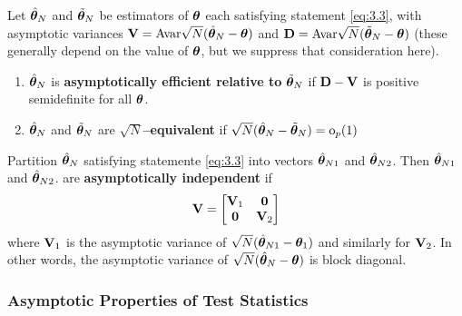 \documentclass[11pt, oneside, a4paper, article]{article}
\numberwithin{equation}{section}
\begin{document}
\begin{defn} 
Let $\hat{\boldsymbol{\theta}}_{N}$ and $\tilde{\boldsymbol{\theta}}_{N}$ be estimators of $\boldsymbol{\theta}$ each satisfying statement \eqref{eq:3.3}, with asymptotic variances
$\mathbf{V} = \text{Avar} \sqrt{N} (\hat{\boldsymbol{\theta}}_{N} - \boldsymbol{\theta})$
and
$\mathbf{D} = \text{Avar} \sqrt{N} (\tilde{\boldsymbol{\theta}}_{N} - \boldsymbol{\theta})$
(these generally depend on the value of $\boldsymbol{\theta}$, but we suppress that consideration here).

\vspace{-1 ex}
\begin{enumerate}
	\item 
$\hat{\boldsymbol{\theta}}_{N}$ is \textbf{asymptotically efficient relative to} $\tilde{\boldsymbol{\theta}}_{N}$ if
$\mathbf{D} - \mathbf{V}$ is positive semidefinite for all $\boldsymbol{\theta}$.

	\item 
$\hat{\boldsymbol{\theta}}_{N}$ and $\tilde{\boldsymbol{\theta}}_{N}$ are
\textbf{$\sqrt{N}$--equivalent} if
$\sqrt{N}(\hat{\boldsymbol{\theta}}_{N} - \tilde{\boldsymbol{\theta}}_{N}) = \text{o}_{p}(1)$
\end{enumerate}
\end{defn}

\begin{defn} 
Partition $\hat{\boldsymbol{\theta}}_{N}$ satisfying statemente \eqref{eq:3.3} into vectors
$\hat{\boldsymbol{\theta}}_{N1}$ and $\hat{\boldsymbol{\theta}}_{N2}$.
Then 
$\hat{\boldsymbol{\theta}}_{N1}$ and $\hat{\boldsymbol{\theta}}_{N2}$.
are \textbf{asymptotically independent} if
\begin{equation*}
	\mathbf{V} = 
	\begin{bmatrix}
		\mathbf{V}_{1} & \boldsymbol{0} 		\\
		\boldsymbol{0} & \mathbf{V}_{2}
	\end{bmatrix}
\end{equation*}
where $\mathbf{V}_{1}$ is the asymptotic variance of 
$\sqrt{N}(\hat{\boldsymbol{\theta}}_{N1} - \boldsymbol{\theta}_{1})$
and similarly for $\mathbf{V}_{2}$.
In other words, the asymptotic variance of 
$\sqrt{N}(\hat{\boldsymbol{\theta}}_{N} - \boldsymbol{\theta})$
is block diagonal.
\end{defn}

\subsubsection{Asymptotic Properties of Test Statistics}
\end{document}
